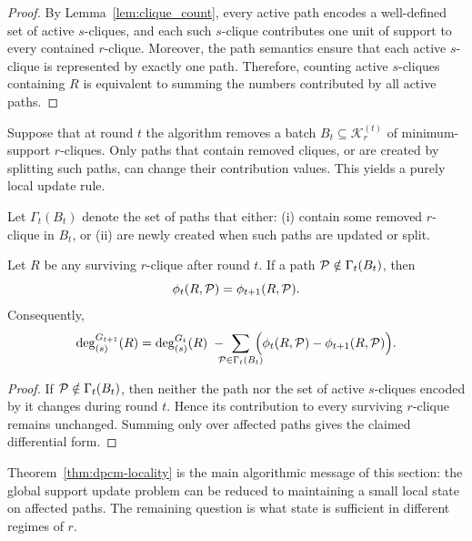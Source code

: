 \begin{proof}
By Lemma~\ref{lem:clique_count}, every active path encodes a well-defined set of active $s$-cliques, and each such $s$-clique contributes one unit of support to every contained $r$-clique.
%
Moreover, the \cpi path semantics ensure that each active $s$-clique is represented by exactly one path.
%
Therefore, counting active $s$-cliques containing $R$ is equivalent to summing the numbers contributed by all active paths.
\end{proof}

Suppose that at round $t$ the algorithm removes a batch $B_t \subseteq \mathcal{K}_r^{(t)}$ of minimum-support $r$-cliques.
%
Only paths that contain removed cliques, or are created by splitting such paths, can change their contribution values.
%
This yields a purely local update rule.

\begin{definition}\label{def:affected-paths}
Let $\Gamma_t(B_t)$ denote the set of paths that either:
(i) contain some removed $r$-clique in $B_t$, or
(ii) are newly created when such paths are updated or split.
\end{definition}

\begin{theorem}\label{thm:dpcm-locality}
Let $R$ be any surviving $r$-clique after round $t$.
If a path $\TPath \notin \Gamma_t(B_t)$, then
\[
\phi_t(R,\TPath)=\phi_{t+1}(R,\TPath).
\]
Consequently,
\[
\deg^{G_{t+1}}_{(s)}(R)
=
\deg^{G_t}_{(s)}(R)
\;-\!\!\!\!\sum_{\TPath \in \Gamma_t(B_t)}\!\!\!\!
\Bigl(\phi_t(R,\TPath)-\phi_{t+1}(R,\TPath)\Bigr).
\]
\end{theorem}

\begin{proof}
If $\TPath \notin \Gamma_t(B_t)$, then neither the path nor the set of active $s$-cliques encoded by it changes during round $t$.
%
Hence its contribution to every surviving $r$-clique remains unchanged.
%
Summing only over affected paths gives the claimed differential form.
\end{proof}

Theorem~\ref{thm:dpcm-locality} is the main algorithmic message of this section:
the global support update problem can be reduced to maintaining a small local state on affected paths.
%
The remaining question is what state is sufficient in different regimes of $r$.

